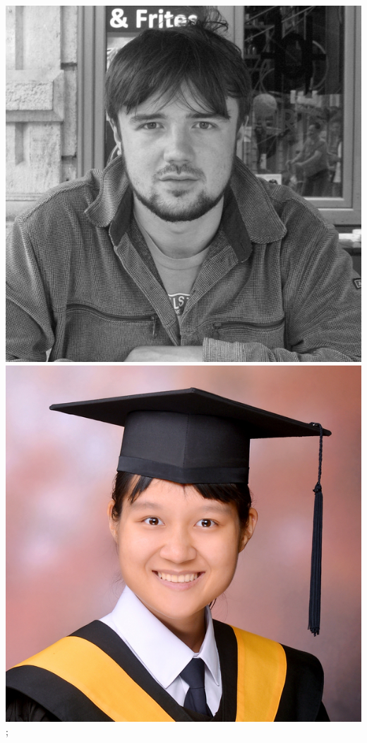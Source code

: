 \documentclass[aspectratio=169,handout]{beamer}
\begin{document}
\begin{frame}
{        \includegraphics[width=0.09\textheight]{figures/students/sam_leeney.jpg}%
        \includegraphics[width=0.09\textheight]{figures/students/wei-ning_deng.jpg}%
    };

\end{frame}
\end{document}
